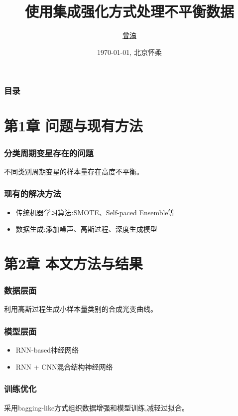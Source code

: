 \documentclass[10pt]{ctexbeamer}
\title[UCAS Beamer (\LaTeX{})]{使用集成强化方式处理不平衡数据}
\author[H. Zeng]{\href{mailto:haozeng1210@gmail.com}{曾滈}}
\institute[NAOC]{中国科学院国家天文台}
\date[\today]{\today, 北京怀柔}
\begin{document}
\begin{frame}[plain]
  \maketitle
\end{frame}

\begin{frame}[t]
  \frametitle{目录}
  \tableofcontents
\end{frame}


\section{第1章 问题与现有方法}\label{sec:1}

\begin{frame}[t]
  \frametitle{分类周期变星存在的问题}
  不同类别周期变星的样本量存在高度不平衡。
\end{frame}

\begin{frame}[t]
  \frametitle{现有的解决方法}
  \begin{itemize}
    \item 传统机器学习算法:SMOTE、Self-paced Ensemble等
    \item 数据生成:添加噪声、高斯过程、深度生成模型
  \end{itemize}
\end{frame}

\section{第2章 本文方法与结果}\label{sec:2}

\begin{frame}[t]
  \frametitle{数据层面}
  利用高斯过程生成小样本量类别的合成光变曲线。
\end{frame}

\begin{frame}[t]
  \frametitle{模型层面}
  \begin{itemize}
    \item RNN-based神经网络
    \item RNN + CNN混合结构神经网络
  \end{itemize}
\end{frame}

\begin{frame}[t]
  \frametitle{训练优化}
  采用bagging-like方式组织数据增强和模型训练,减轻过拟合。
\end{frame}
\end{document}

